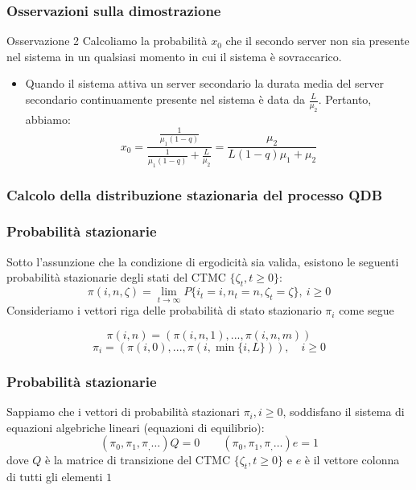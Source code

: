 \documentclass{beamer}
\begin{document}
\begin{frame}
    \frametitle{Osservazioni sulla dimostrazione}
    \begin{block}{Osservazione 2}
        Calcoliamo la probabilità $x_0$ che il secondo server non sia presente nel sistema in un qualsiasi momento in cui il sistema è sovraccarico.

        \begin{itemize}
            \item  Quando il sistema attiva un server secondario la durata media del server secondario continuamente presente nel sistema è data da $\frac{L}{\mu_2}$. Pertanto, abbiamo:
            \begin{equation*}
                x_0  = \frac{\frac{1}{\mu_1(1-q)}}{\frac{1}{\mu_1(1-q)} + \frac{L}{\mu_2}} = \frac{\mu_2}{L(1-q)\mu_1 + \mu_2}
            \end{equation*}
        \end{itemize}
    \end{block}
\end{frame}

\subsubsection{Calcolo della distribuzione stazionaria del processo QDB}

\begin{frame}
    \frametitle{Probabilità stazionarie}
    Sotto l'assunzione che la condizione di ergodicità sia valida, esistono le seguenti probabilità stazionarie degli stati del CTMC $\{\zeta_t, t \geq 0\}$:
    $$\pi(i,n,\zeta) = \lim_{t \to \infty} P\{i_t = i, n_t = n, \zeta_t = \zeta\}, ~ i \geq 0$$
    Consideriamo i vettori riga delle probabilità di stato stazionario $\pi_i$ come segue
    \begin{block}{}
        $$\pi(i,n) = (\pi(i,n,1), ..., \pi(i,n,m))$$
        $$\pi_i = (\pi(i,0), ..., \pi(i, \min \{i,L\})), \quad i \geq 0$$
    \end{block}
\end{frame}


\begin{frame}
    \frametitle{Probabilità stazionarie}
    Sappiamo che i vettori di probabilità stazionari $\pi_i, i \geq 0$, soddisfano il sistema di equazioni algebriche lineari (equazioni di equilibrio):
    $$(\pi_0, \pi_1, \pi_, \dots)Q = 0 \qquad (\pi_0, \pi_1, \pi_, \dots)e = 1$$
    dove $Q$ è la matrice di transizione del CTMC $\{\zeta_t, t \geq 0\}$ e $e$ è il vettore colonna di tutti gli elementi $1$
\end{frame}
\end{document}
